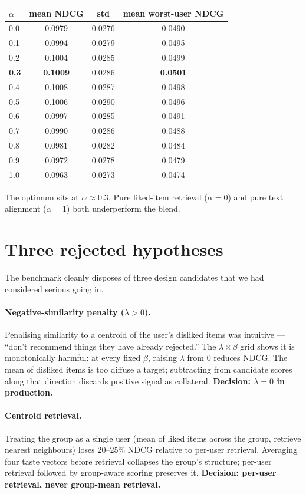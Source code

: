 \documentclass[11pt]{article}
\begin{document}
\begin{center}
\begin{tabular}{lccc}
\toprule
$\alpha$ & mean NDCG & std & mean worst-user NDCG \\
\midrule
0.0 & 0.0979 & 0.0276 & 0.0490 \\
0.1 & 0.0994 & 0.0279 & 0.0495 \\
0.2 & 0.1004 & 0.0285 & 0.0499 \\
\textbf{0.3} & \textbf{0.1009} & 0.0286 & \textbf{0.0501} \\
0.4 & 0.1008 & 0.0287 & 0.0498 \\
0.5 & 0.1006 & 0.0290 & 0.0496 \\
0.6 & 0.0997 & 0.0285 & 0.0491 \\
0.7 & 0.0990 & 0.0286 & 0.0488 \\
0.8 & 0.0981 & 0.0282 & 0.0484 \\
0.9 & 0.0972 & 0.0278 & 0.0479 \\
1.0 & 0.0963 & 0.0273 & 0.0474 \\
\bottomrule
\end{tabular}
\end{center}

The optimum sits at $\alpha \approx 0.3$. Pure liked-item retrieval
($\alpha = 0$) and pure text alignment ($\alpha = 1$) both underperform
the blend.

\section{Three rejected hypotheses}
\label{sec:rejected}

The benchmark cleanly disposes of three design candidates that we had
considered serious going in.

\paragraph{Negative-similarity penalty ($\lambda > 0$).}
Penalising similarity to a centroid of the user's disliked items was
intuitive --- ``don't recommend things they have already rejected.''
The $\lambda \times \beta$ grid shows it is monotonically harmful: at
every fixed $\beta$, raising $\lambda$ from 0 reduces NDCG. The mean
of disliked items is too diffuse a target; subtracting from candidate
scores along that direction discards positive signal as collateral.
\textbf{Decision: $\lambda = 0$ in production.}

\paragraph{Centroid retrieval.}
Treating the group as a single user (mean of liked items across the
group, retrieve nearest neighbours) loses 20--25\% NDCG relative to per-user
retrieval. Averaging four taste vectors before retrieval collapses the
group's structure; per-user retrieval followed by group-aware scoring
preserves it.
\textbf{Decision: per-user retrieval, never group-mean retrieval.}
\end{document}
